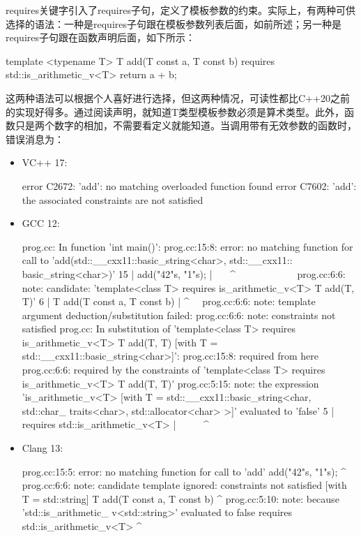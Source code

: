 requires关键字引入了requires子句，定义了模板参数的约束。实际上，有两种可供选择的语法：一种是requires子句跟在模板参数列表后面，如前所述；另一种是requires子句跟在函数声明后面，如下所示：

\begin{cppcode}
template <typename T>
T add(T const a, T const b)
requires std::is_arithmetic_v<T>
{
	return a + b;
}
\end{cppcode}

这两种语法可以根据个人喜好进行选择，但这两种情况，可读性都比C++20之前的实现好得多。通过阅读声明，就知道T类型模板参数必须是算术类型。此外，函数只是两个数字的相加，不需要看定义就能知道。当调用带有无效参数的函数时，错误消息为：

\begin{itemize}
  \item VC++ 17:

\begin{shell}
error C2672: 'add': no matching overloaded function found
error C7602: 'add': the associated constraints are not
satisfied
\end{shell}
  \item GCC 12:

\begin{shell}
prog.cc: In function 'int main()':
prog.cc:15:8: error: no matching function for call
to 'add(std::__cxx11::basic_string<char>, std::__cxx11::
basic_string<char>)'
  15 |    add("42"s, "1"s);
     |     ~~~^~~~~~~~~~~~~
prog.cc:6:6: note: candidate: 'template<class T> 
requires is_arithmetic_v<T> T add(T, T)'
  6  |    T add(T const a, T const b)
     |      ^~~
prog.cc:6:6: note: template argument deduction/substitution
 failed:
prog.cc:6:6: note: constraints not satisfied
prog.cc: In substitution of 'template<class
T> requires is_arithmetic_v<T> T add(T, T) [with T =
std::__cxx11::basic_string<char>]':
prog.cc:15:8: required from here
prog.cc:6:6: required by the constraints of
'template<class T> requires is_arithmetic_v<T> T add(T,
T)'
prog.cc:5:15: note: the expression 'is_arithmetic_v<T>
[with T = std::__cxx11::basic_string<char, std::char_
traits<char>, std::allocator<char> >]' evaluated to 'false'
    5 | requires std::is_arithmetic_v<T>
      |               ~~~~~^~~~~~~~~~~~~~~~~~
\end{shell}
  \item Clang 13:

\begin{shell}
prog.cc:15:5: error: no matching function for call to
'add'
add("42"s, "1"s);
^~~
prog.cc:6:6: note: candidate template ignored:
constraints not satisfied [with T = std::string]
T add(T const a, T const b)
^
prog.cc:5:10: note: because 'std::is_arithmetic_
v<std::string>' evaluated to false
requires std::is_arithmetic_v<T>
^
\end{shell}
\end{itemize}

